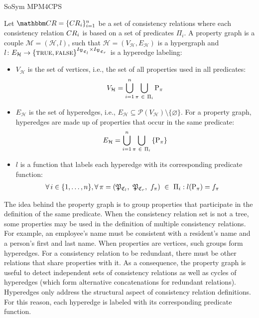 \begin{copiedFrom}{SoSym MPM4CPS}
\begin{definition}
Let $\consistencyrelationset{CR} = \{\consistencyrelation{CR}{i}\}_{i = 1}^{n}$ be a set of consistency relations where each consistency relation $\consistencyrelation{CR}{i}$ is based on a set of predicates $\Pi_i$. 
A property graph is a couple $\mathcal{M} =(\mathcal{H}, l)$, such that $\mathcal{H} = (V_{\mathcal{H}}, E_{\mathcal{H}})$ is a hypergraph and $l\colon E_{\mathcal{H}}\to \{\textsc{true}, \textsc{false}\}^{I_{\propertysettuple{P}{\classtuple{C}{l}}} \times I_{\propertysettuple{P}{\classtuple{C}{r}}}}$ is a hyperedge labeling:
        \begin{itemize}
            \item $V_{\mathcal{H}}$ is the set of vertices, i.e., the set of all properties used in all predicates:
\[V_{\mathcal{H}} = \bigcup_{i = 1}^{n} \bigcup_{\pi\ \in\ \Pi_{i}} \mathrm{P}_{\pi}\]
            \item $E_{\mathcal{H}}$ is the set of hyperedges, i.e., $E_{\mathcal{H}} \subseteq \mathcal{P}(V_{\mathcal{H}}) \setminus \{\varnothing\}$. For a property graph, hyperedges are made up of properties that occur in the same predicate:
\[E_{\mathcal{H}} = \bigcup_{i = 1}^{n} \bigcup_{\pi\ \in\ \Pi_{i}} \left\{\mathrm{P}_{\pi}\right\}\]
            \item $l$ is a function that labels each hyperedge with its corresponding predicate function:
\begin{align*}
    &\forall i \in \{1, \dots, n\}, \forall \pi = (\propertysettuple{P}{\classtuple{C}{l}},\ \propertysettuple{P}{\classtuple{C}{r}},\ f_\pi)\ \in\ \Pi_{i} : %
    l(\propertycollection{\pi}) = f_\pi
\end{align*}
        \end{itemize}
        \label{def:propertygraph}
\end{definition}

The idea behind the property graph is to group properties that participate in the definition of the same predicate. When the consistency relation set is not a tree, some properties may be used in the definition of multiple consistency relations. For example, an employee's name must be consistent with a resident's name and a person's first and last name. When properties are vertices, such groups form hyperedges. For a consistency relation to be redundant, there must be other relations that share properties with it. As a consequence, the property graph is useful to detect independent sets of consistency relations as well as cycles of hyperedges (which form alternative concatenations for redundant relations). Hyperedges only address the structural aspect of consistency relation definitions. For this reason, each hyperedge is labeled with its corresponding predicate function.


\end{copiedFrom}
